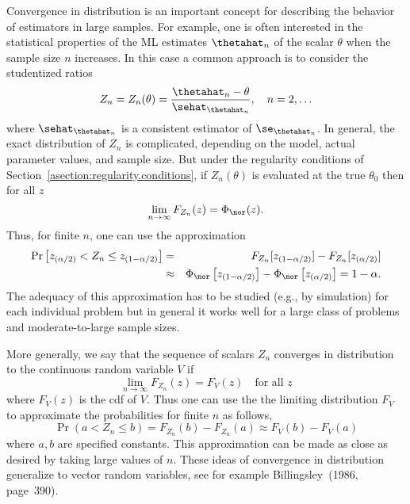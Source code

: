 Convergence in distribution is an important concept for describing the
behavior of estimators in large samples.  For example, one is often
interested in the statistical properties of the ML estimates
$\thetahat_{n}$ of the scalar $\theta $ when the sample
size $n$ increases.  In this case a common approach is to consider the
studentized ratios
\begin{equation} \label{equation:standardized.zratio}
Z_{n}=Z_{n}(\theta)
=\frac{\thetahat_{n}-\theta }
	   {\sehat_{\thetahat_{n}}}, \quad n=2, \ldots
\end{equation}
where $\sehat_{\thetahat_{n}}$ is a consistent
estimator of 
$\se_{\thetahat_{n}}$.  In
general, the exact distribution of $Z_{n}$ is complicated, depending on the
model, actual parameter values, and sample size.  But under the
regularity conditions of
Section~\ref{asection:regularity.conditions},
if $Z_{n}(\theta)$ is evaluated at the true $\theta_{0}$ then
for all $z$
\begin{displaymath}
 \lim_{n \to \infty} F_{Z_{n}}(z)=\Phi_{\nor}(z).
\end{displaymath}
Thus, for finite $n$, one can use the approximation
\begin{eqnarray*}
\Pr \left [
    z_{(\alpha/2)}< Z_{n} \le z_{(1-\alpha/2)}
    \right ]
&=&
F_{Z_{n}}
[
z_{(1-\alpha/2)}
]
-
F_{Z_{n}}
[
z_{(\alpha/2)}
]
\\
  &   \approx &
\Phi_{\nor}\left [z_{(1-\alpha/2)} \right ]-
\Phi_{\nor}\left [z_{(\alpha/2)} \right ]
=1-\alpha.
\end{eqnarray*}
The adequacy of this approximation has to be studied 
(e.g., by simulation) for each
individual problem but in general it works well for a large class of
problems and moderate-to-large sample sizes.

More generally, 
we 
say that the sequence of scalars  $Z_{n}$ converges in
distribution to the continuous random variable $V$ if
 \begin{displaymath}
  \lim_{n \to \infty} F_{Z_{n}}(z)=F_{V}(z)
\quad \mbox{for all $z$}
 \end{displaymath}
where 
$F_{V}(z)$ is the cdf of $V$. 
Thus one can use the
the limiting distribution $F_{V}$ to 
approximate the probabilities for finite $n$
as follows,
\begin{displaymath}
\Pr \left (
    a< Z_{n} \le b 
    \right )=
F_{Z_{n}}(b)-F_{Z_{n}}(a)
     \approx 
F_{V}(b)-F_{V}(a)
\end{displaymath}
where $a, b$ are specified constants. This approximation can be made
as close as desired by taking large values of $n$.  These ideas of
convergence in distribution generalize to vector random variables, see
for example Billingsley~(1986, page~390).

